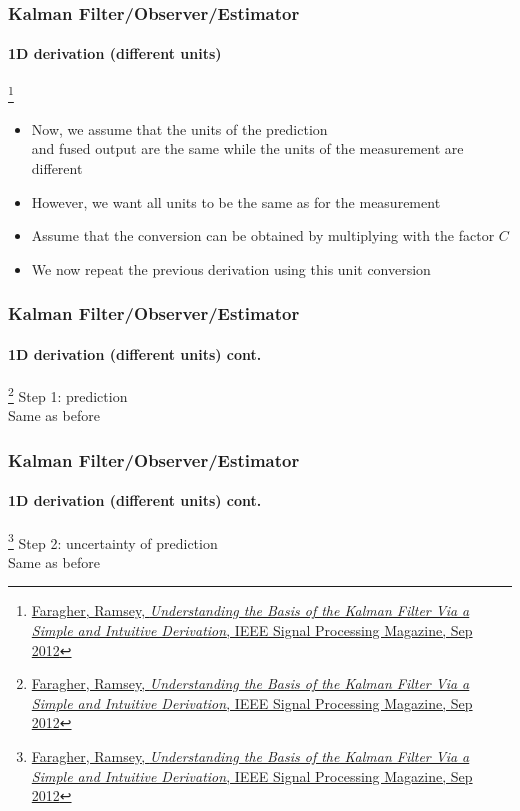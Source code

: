 \begin{frame}
\frametitle{Kalman Filter/Observer/Estimator}
\framesubtitle{1D derivation (different units)}

\footnote{\tiny\hspace{-0.23in} \href{http://www.cl.cam.ac.uk/~rmf25/papers/Understanding the Basis of the Kalman Filter.pdf}{Faragher, Ramsey, \emph{Understanding the Basis of the Kalman Filter Via a Simple and Intuitive Derivation}, IEEE Signal Processing Magazine, Sep 2012}}
\scriptsize 
\begin{itemize}\scriptsize
\item Now, we assume that the units of the prediction \\and fused output are the same while the units of the measurement are different
\item However, we want all units to be the same as for the measurement
\item Assume that the conversion can be obtained by multiplying with the factor $C$
\item We now repeat the previous derivation using this unit conversion
\end{itemize}
\end{frame}



\begin{frame}
\frametitle{Kalman Filter/Observer/Estimator}
\framesubtitle{1D derivation (different units) \tiny cont.}

\footnote{\tiny\hspace{-0.23in} \href{http://www.cl.cam.ac.uk/~rmf25/papers/Understanding the Basis of the Kalman Filter.pdf}{Faragher, Ramsey, \emph{Understanding the Basis of the Kalman Filter Via a Simple and Intuitive Derivation}, IEEE Signal Processing Magazine, Sep 2012}}
\scriptsize 
Step 1: {\color{red}prediction}\\
Same as before
\end{frame}


\begin{frame}
\frametitle{Kalman Filter/Observer/Estimator}
\framesubtitle{1D derivation (different units) \tiny cont.}

\footnote{\tiny\hspace{-0.23in} \href{http://www.cl.cam.ac.uk/~rmf25/papers/Understanding the Basis of the Kalman Filter.pdf}{Faragher, Ramsey, \emph{Understanding the Basis of the Kalman Filter Via a Simple and Intuitive Derivation}, IEEE Signal Processing Magazine, Sep 2012}}
\scriptsize 
Step 2: {\color{red}uncertainty of prediction}\\
Same as before
\end{frame}


